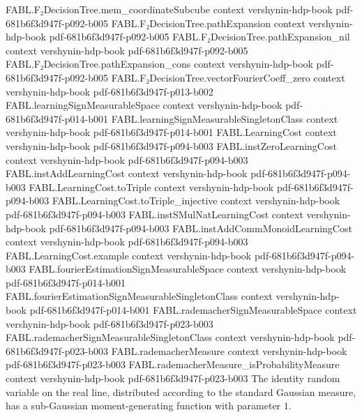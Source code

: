 \begin{theorem}
\proofstep
  {FABL.F₂DecisionTree.mem_coordinateSubcube}
  {context}
  {vershynin-hdp-book}
  {pdf-681b6f3d947f-p092-b005}
\proofstep
  {FABL.F₂DecisionTree.pathExpansion}
  {context}
  {vershynin-hdp-book}
  {pdf-681b6f3d947f-p092-b005}
\proofstep
  {FABL.F₂DecisionTree.pathExpansion_nil}
  {context}
  {vershynin-hdp-book}
  {pdf-681b6f3d947f-p092-b005}
\proofstep
  {FABL.F₂DecisionTree.pathExpansion_cons}
  {context}
  {vershynin-hdp-book}
  {pdf-681b6f3d947f-p092-b005}
\proofstep
  {FABL.F₂DecisionTree.vectorFourierCoeff_zero}
  {context}
  {vershynin-hdp-book}
  {pdf-681b6f3d947f-p013-b002}
\proofstep
  {FABL.learningSignMeasurableSpace}
  {context}
  {vershynin-hdp-book}
  {pdf-681b6f3d947f-p014-b001}
\proofstep
  {FABL.learningSignMeasurableSingletonClass}
  {context}
  {vershynin-hdp-book}
  {pdf-681b6f3d947f-p014-b001}
\proofstep
  {FABL.LearningCost}
  {context}
  {vershynin-hdp-book}
  {pdf-681b6f3d947f-p094-b003}
\proofstep
  {FABL.instZeroLearningCost}
  {context}
  {vershynin-hdp-book}
  {pdf-681b6f3d947f-p094-b003}
\proofstep
  {FABL.instAddLearningCost}
  {context}
  {vershynin-hdp-book}
  {pdf-681b6f3d947f-p094-b003}
\proofstep
  {FABL.LearningCost.toTriple}
  {context}
  {vershynin-hdp-book}
  {pdf-681b6f3d947f-p094-b003}
\proofstep
  {FABL.LearningCost.toTriple_injective}
  {context}
  {vershynin-hdp-book}
  {pdf-681b6f3d947f-p094-b003}
\proofstep
  {FABL.instSMulNatLearningCost}
  {context}
  {vershynin-hdp-book}
  {pdf-681b6f3d947f-p094-b003}
\proofstep
  {FABL.instAddCommMonoidLearningCost}
  {context}
  {vershynin-hdp-book}
  {pdf-681b6f3d947f-p094-b003}
\proofstep
  {FABL.LearningCost.example}
  {context}
  {vershynin-hdp-book}
  {pdf-681b6f3d947f-p094-b003}
\proofstep
  {FABL.fourierEstimationSignMeasurableSpace}
  {context}
  {vershynin-hdp-book}
  {pdf-681b6f3d947f-p014-b001}
\proofstep
  {FABL.fourierEstimationSignMeasurableSingletonClass}
  {context}
  {vershynin-hdp-book}
  {pdf-681b6f3d947f-p014-b001}
\proofstep
  {FABL.rademacherSignMeasurableSpace}
  {context}
  {vershynin-hdp-book}
  {pdf-681b6f3d947f-p023-b003}
\proofstep
  {FABL.rademacherSignMeasurableSingletonClass}
  {context}
  {vershynin-hdp-book}
  {pdf-681b6f3d947f-p023-b003}
\proofstep
  {FABL.rademacherMeasure}
  {context}
  {vershynin-hdp-book}
  {pdf-681b6f3d947f-p023-b003}
\proofstep
  {FABL.rademacherMeasure_isProbabilityMeasure}
  {context}
  {vershynin-hdp-book}
  {pdf-681b6f3d947f-p023-b003}
\label{FABL.standardGaussian_hasSubgaussianMGF}
\leanok
{}
The identity random variable on the real line, distributed according to the standard
Gaussian measure, has a sub-Gaussian moment-generating function with parameter $1$.
\end{theorem}

